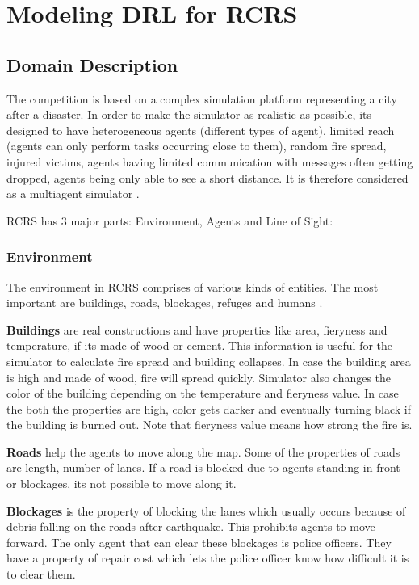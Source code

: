 \documentclass[12pt]{report}
\begin{document}
\chapter{Modeling DRL for RCRS}

\section{Domain Description}

The competition is based on a complex simulation platform representing a city after a disaster. In order to make the simulator as realistic as possible, its designed to have heterogeneous agents (different types of agent), limited reach (agents can only perform tasks occurring close to them), random fire spread, injured victims, agents having limited communication with messages often getting dropped, agents being only able to see a short distance. It is therefore considered as a multiagent simulator \cite{Kitano}.  

RCRS has 3 major parts: Environment, Agents and Line of Sight:

\subsection{Environment}

The environment in RCRS comprises of various kinds of entities. The most important are buildings, roads, blockages, refuges and humans \cite{Morimoto}. 


\textbf{Buildings} are real constructions and have properties like area, fieryness and temperature, if its made of wood or cement. This information is useful for the simulator to calculate fire spread and building collapses. In case the building area is high and made of wood, fire will spread quickly. Simulator also changes the color of the building depending on the temperature and fieryness value. In case the both the properties are high, color gets darker and eventually turning black if the building is burned out. Note that fieryness value means how strong the fire is. 

\textbf{Roads} help the agents to move along the map. Some of the properties of roads are length, number of lanes. If a road is blocked due to agents standing in front or blockages, its not possible to move along it. 

\textbf{Blockages} is the property of blocking the lanes which usually occurs because of debris falling on the roads after earthquake. This prohibits agents to move forward. The only agent that can clear these blockages is police officers. They have a property of repair cost which lets the police officer know how difficult it is to clear them. 
\end{document}
